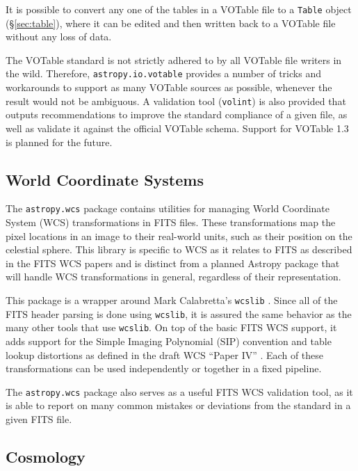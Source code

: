 \documentclass[traditabstract]{aa}
\begin{document}
It is possible to convert any one of the tables in a VOTable file to
a \texttt{Table} object (\S\ref{sec:table}), where it
can be edited and then written back to a VOTable file without any loss
of data.

The VOTable standard is not strictly adhered to by all VOTable file
writers in the wild.  Therefore, \texttt{astropy.io.votable} provides
a number of tricks and workarounds to support as many VOTable sources
as possible, whenever the result would not be ambiguous.  A validation
tool (\texttt{volint}) is also provided that outputs recommendations
to improve the standard compliance of a given file, as well as
validate it against the official VOTable schema.
Support for VOTable 1.3 is planned for the future.

\subsection{World Coordinate Systems}

\label{sec:wcs}


The \texttt{astropy.wcs} package contains utilities for managing World Coordinate
System (WCS) transformations in FITS files.  These transformations map
the pixel locations in an image to their real-world units, such as
their position on the celestial sphere.  This library is specific to
WCS as it relates to FITS as described in the FITS WCS papers
\citep{greisen2002wcs,calabretta2002wcs,greisen2006wcs} and is
distinct from a planned Astropy package that will handle WCS
transformations in general, regardless of their representation.

This package is a wrapper around Mark Calabretta's
\texttt{wcslib} \citep{calabretta2013wcslib}.  Since all of the FITS
header parsing is done using \texttt{wcslib}, it is assured the same
behavior as the many other tools that use \texttt{wcslib}.  On top of
the basic FITS WCS support, it adds support for the Simple Imaging
Polynomial (SIP) convention and table lookup distortions as defined in
the draft WCS ``Paper IV'' \citep{calabretta2004wcs}.  Each of these
transformations can be used independently or together in a fixed
pipeline.

The \texttt{astropy.wcs} package also serves as a useful FITS WCS validation tool,
as it is able to report on many common mistakes or deviations from the
standard in a given FITS file.

\subsection{Cosmology}
\end{document}
